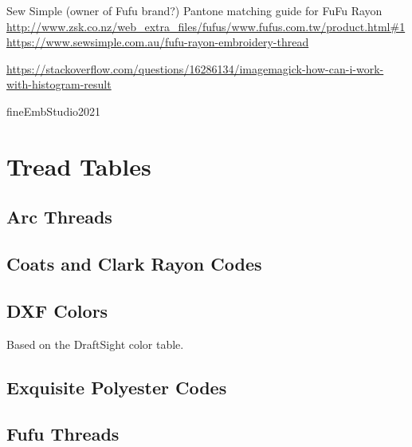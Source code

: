 \documentclass[a4paper]{report}
\begin{document}
Sew Simple (owner of Fufu brand?) Pantone matching guide for FuFu Rayon
\url{http://www.zsk.co.nz/web_extra_files/fufus/www.fufus.com.tw/product.html#1}
\url{https://www.sewsimple.com.au/fufu-rayon-embroidery-thread}

\url{https://stackoverflow.com/questions/16286134/imagemagick-how-can-i-work-with-histogram-result}

fineEmbStudio2021




\appendix

\chapter{Tread Tables}

\section{Arc Threads}

%

%

\section{Coats and Clark Rayon Codes}

%

\section{DXF Colors}

Based on the DraftSight color table.

%

\section{Exquisite Polyester Codes}

%

\section{Fufu Threads}

%

%
\end{document}
